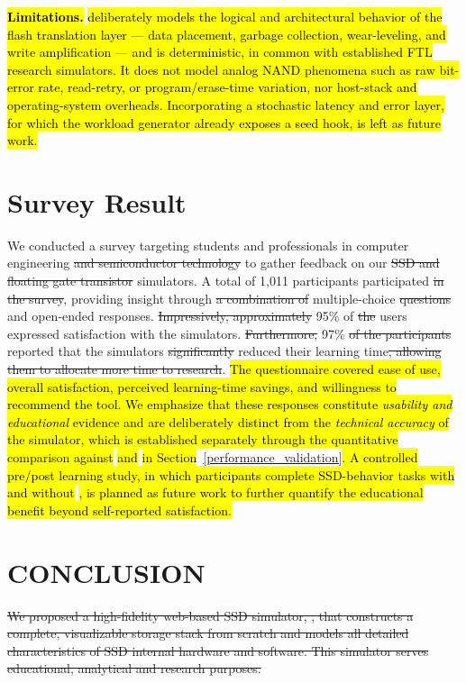 \documentclass{ieeeaccess}
\begin{document}
\hl{\textbf{Limitations.}} \eyanassdsim \hl{deliberately models the logical and architectural behavior of the flash translation layer --- data placement, garbage collection, wear-leveling, and write amplification --- and is deterministic, in common with established FTL research simulators. It does not model analog NAND phenomena such as raw bit-error rate, read-retry, or program/erase-time variation, nor host-stack and operating-system overheads. Incorporating a stochastic latency and error layer, for which the workload generator already exposes a seed hook, is left as future work.}


\section{Survey Result}
\label{survey_result}
We conducted a survey targeting students and professionals in computer engineering \sout{and semiconductor technology} to gather feedback on our \sout{SSD and floating gate transistor} simulators. A total of 1,011 participants participated \sout{in the survey}, providing insight through \sout{a combination of} multiple-choice \sout{questions} and open-ended responses. \sout{Impressively, approximately} 95\% of \sout{the} users expressed satisfaction with the simulators. \sout{Furthermore,} 97\% \sout{of the participants} reported that the simulators \sout{significantly} reduced their learning time\sout{, allowing them to allocate more time to research}. \hl{The questionnaire covered ease of use, overall satisfaction, perceived learning-time savings, and willingness to recommend the tool. We emphasize that these responses constitute \emph{usability and educational} evidence and are deliberately distinct from the \emph{technical accuracy} of the simulator, which is established separately through the quantitative comparison against} \ftlsim \hl{and} \femu \hl{in Section}~\ref{performance_validation}\hl{. A controlled pre/post learning study, in which participants complete SSD-behavior tasks with and without} \eyanassdsim\hl{, is planned as future work to further quantify the educational benefit beyond self-reported satisfaction.}

\section{CONCLUSION}
\label{conclusion}
\sout{We proposed a high-fidelity web-based SSD simulator, \eyanassdsim, that constructs a complete, visualizable storage stack from scratch and models all detailed characteristics of SSD internal hardware and software. This simulator serves educational, analytical and research purposes.}
\end{document}
